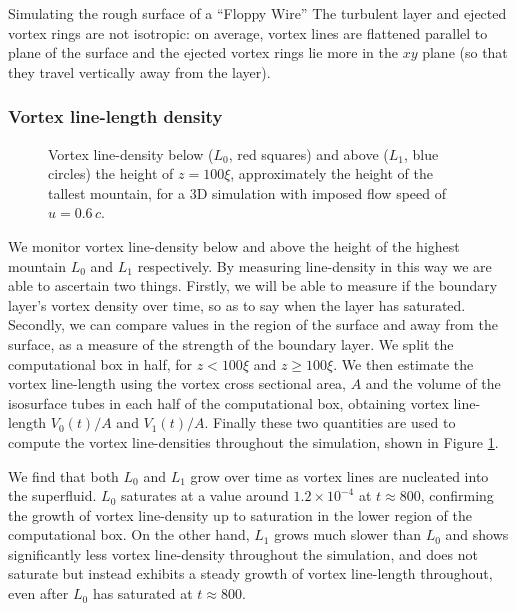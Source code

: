 \begin{chapter}{\label{cha:afm}Simulating the rough surface of a ``Floppy Wire''}
The turbulent layer and ejected vortex rings are not isotropic: on average, vortex lines are flattened parallel to plane of the surface and the ejected vortex rings lie more in the $xy$ plane (so that they travel vertically away from the layer).

\subsubsection{Vortex line-length density}
\begin{figure}
  \centering
  \caption{\label{fig:vortlinedensdt}Vortex line-density below ($L_0$, red squares) and above ($L_1$, blue circles) the height of $z=100\xi$, approximately the height of the tallest mountain, for a 3D simulation with imposed flow speed of $u=0.6\,c$.} 
  \end{figure}
We monitor vortex line-density below and above the height of the highest mountain $L_0$ and $L_1$ respectively. By measuring line-density in this way we are able to ascertain two things. Firstly, we will be able to measure if the boundary layer's vortex density over time, so as to say when the layer has saturated. Secondly, we can compare values in the region of the surface and away from the surface, as a measure of the strength of the boundary layer. We split the computational box in half, for $z<100\xi$ and $z \geq 100\xi$. We then estimate the vortex line-length using the vortex cross sectional area, $A$ and the volume of the isosurface tubes in each half of the computational box, obtaining vortex line-length $V_0(t)/A$ and $V_1(t)/A$. Finally these two quantities are used to compute the vortex line-densities throughout the simulation, shown in Figure \ref{fig:vortlinedensdt}.

We find that both $L_0$ and $L_1$ grow over time as vortex lines are nucleated into the superfluid. $L_0$ saturates at a value around $1.2\times 10^{-4}$ at $t \approx 800$, confirming the growth of vortex line-density up to saturation in the lower region of the computational box. On the other hand, $L_1$ grows much slower than $L_0$ and shows significantly less vortex line-density throughout the simulation, and does not saturate but instead exhibits a steady growth of vortex line-length throughout, even after $L_0$ has saturated at $t \approx 800$.


\end{chapter}

